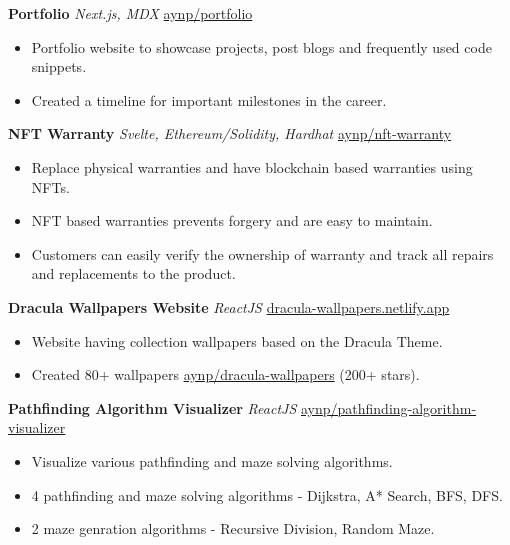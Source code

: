\documentclass[a4paper]{article}
\begin{document}
{\textbf{Portfolio}} {\sl Next.js, MDX} \hfill \href{https://github.com/aynp/portfolio}{aynp/portfolio}\\
\begin{itemize}
	\item Portfolio website to showcase projects, post blogs and frequently used code snippets.
	\item Created a timeline for important milestones in the career.
\end{itemize}
\vspace*{1.5mm}

{\textbf{NFT Warranty}} {\sl Svelte, Ethereum/Solidity, Hardhat} \hfill \href{https://github.com/aynp/nft-warranty}{aynp/nft-warranty}\\
\begin{itemize}
	\item Replace physical warranties and have blockchain based warranties using NFTs.
	\item NFT based warranties prevents forgery and are easy to maintain.
    \item Customers can easily verify the ownership of warranty and track all repairs and replacements to the product.
\end{itemize}
\vspace*{1.5mm}

{\textbf{Dracula Wallpapers Website}} {\sl ReactJS} \hfill \href{https://dracula-wallpapers.netlify.app/}{dracula-wallpapers.netlify.app}\\
\begin{itemize}
	\item Website having collection wallpapers based on the Dracula Theme.
	\item Created 80+ wallpapers \href{https://github.com/aynp/dracula-wallpapers}{aynp/dracula-wallpapers} (200+ stars).
\end{itemize}
\vspace*{1.5mm}

{\textbf{Pathfinding Algorithm Visualizer}} {\sl ReactJS} \hfill \href{https://github.com/aynp/pathfinding-algorithm-visualizer}{aynp/pathfinding-algorithm-visualizer}\\
\begin{itemize}
	\item Visualize various pathfinding and maze solving algorithms.
	\item 4 pathfinding and maze solving algorithms - Dijkstra, A* Search, BFS, DFS.
	\item 2 maze genration algorithms - Recursive Division, Random Maze.
\end{itemize}
\vspace*{1.5mm}
\end{document}
